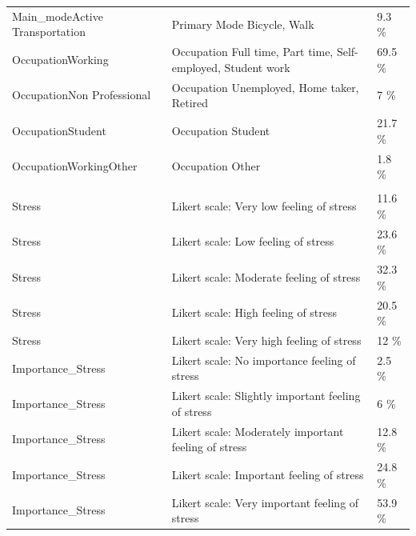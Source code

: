 \documentclass[
11pt, %
oneside, %
english, %
singlespacing, %
]{macthesis} %
\begin{document}
\begin{table}
{\begin{tabular}[t]{lll}
\hspace{1em}Main\_modeActive Transportation & Primary Mode Bicycle, Walk & 9.3 \%\\
\hspace{1em}OccupationWorking & Occupation Full time, Part time, Self-employed, Student work & 69.5 \%\\
\hspace{1em}OccupationNon Professional & Occupation Unemployed, Home taker, Retired & 7 \%\\
\hspace{1em}OccupationStudent & Occupation Student & 21.7 \%\\
\hspace{1em}OccupationWorkingOther & Occupation Other & 1.8 \%\\
\addlinespace[0.3em]
\multicolumn{3}{l}{\textbf{Stress Characteristics}}\\
\hspace{1em}Stress & Likert scale: Very low feeling of stress & 11.6 \%\\
\hspace{1em}Stress & Likert scale: Low feeling of stress & 23.6 \%\\
\hspace{1em}Stress & Likert scale: Moderate feeling of stress & 32.3 \%\\
\hspace{1em}Stress & Likert scale: High feeling of stress & 20.5 \%\\
\hspace{1em}Stress & Likert scale: Very high feeling of stress & 12 \%\\
\hspace{1em}Importance\_Stress & Likert scale: No importance feeling of stress & 2.5 \%\\
\hspace{1em}Importance\_Stress & Likert scale: Slightly important feeling of stress & 6 \%\\
\hspace{1em}Importance\_Stress & Likert scale: Moderately important feeling of stress & 12.8 \%\\
\hspace{1em}Importance\_Stress & Likert scale: Important feeling of stress & 24.8 \%\\
\hspace{1em}Importance\_Stress & Likert scale: Very important feeling of stress & 53.9 \%\\
\bottomrule
\end{tabular}}
\end{table}
\newpage
\end{document}
